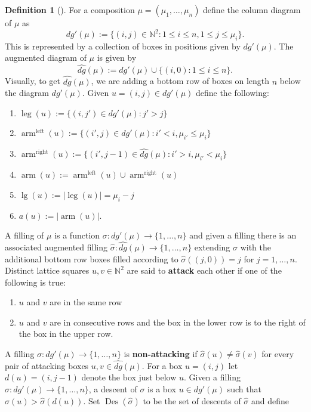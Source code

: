 \documentclass[11pt]{article}
\theoremstyle{definition}
\newtheorem{defi}[theo]{Definition}
\numberwithin{equation}{section}
\DeclareMathOperator{\mathleft}{left}
\DeclareMathOperator{\mathright}{right}
\DeclareMathOperator{\arm}{arm}
\DeclareMathOperator{\leg}{leg}
\DeclareMathOperator{\Des}{Des}
\DeclareMathOperator{\mathleg}{lg}
\begin{document}
\begin{defi}[\cite{haglund2007combinatorial}]
For a composition $\mu = (\mu_1,\ldots,\mu_n)$ define the column diagram of $\mu$ as 
$$dg'(\mu):= \{(i,j)\in \mathbb{N}^2 : 1\leq i\leq n, 1\leq j \leq \mu_i \}.$$ This is represented by a collection of boxes in positions given by $dg'(\mu)$. The augmented diagram of $\mu$ is given by 
$$\widehat{dg}(\mu):= dg'(\mu)\cup\{(i,0): 1\leq i\leq n\}.$$
Visually, to get $\widehat{dg}(\mu)$, we are adding a bottom row of boxes on length $n$ below the diagram $dg'(\mu)$. Given $u = (i,j) \in dg'(\mu)$ define the following:
\begin{enumerate}
    \item $\leg(u) := \{(i,j') \in dg'(\mu): j' > j\}$
    \item $\arm^{\mathleft}(u) := \{(i',j) \in dg'(\mu): i'<i, \mu_{i'} \leq \mu_i\} $
    \item $\arm^{\mathright}(u):= \{(i',j-1) \in \widehat{dg}(\mu): i'>i, \mu_{i'}<\mu_{i}\}$
    \item $\arm(u) := \arm^{\mathleft}(u) \cup \arm^{\mathright}(u)$
    \item $\mathleg(u):= |\leg(u)| = \mu_i -j$
    \item $a(u) := |\arm(u)|.$
\end{enumerate}
A filling of $\mu$ is a function $\sigma: dg'(\mu) \rightarrow \{1,\ldots,n\}$ and given a filling there is an associated augmented filling $\widehat{\sigma}: \widehat{dg}(\mu) \rightarrow \{1,\ldots,n\}$ extending $\sigma$ with the additional bottom row boxes filled according to $\widehat{\sigma}((j,0)) = j$ for $j = 1,\ldots,n$. Distinct lattice squares $u,v \in \mathbb{N}^2$ are said to \textbf{attack} each other if one of the following is true:
\begin{enumerate}
\item $u$ and $v$ are in the same row 
\item $u$ and $v$ are in consecutive rows and the box in the lower row is to the right of the box in the upper row.
\end{enumerate}
A filling $\sigma: dg'(\mu) \rightarrow \{1,\ldots,n\}$ is \textbf{non-attacking} if $\widehat{\sigma}(u) \neq \widehat{\sigma}(v)$ for every pair of attacking boxes $u,v \in \widehat{dg}(\mu).$
For a box $u= (i,j)$ let $d(u) = (i,j-1)$ denote the box just below $u$. Given a filling $\sigma:dg'(\mu)\rightarrow \{1,\ldots,n\}$, a descent of $\sigma$ is a box $u \in dg'(\mu)$ such that $\widehat{\sigma}(u) > \widehat{\sigma}(d(u)).$
Set $\Des(\widehat{\sigma})$ to be the set of descents of $\widehat{\sigma}$ and define 

\end{defi}
\end{document}
